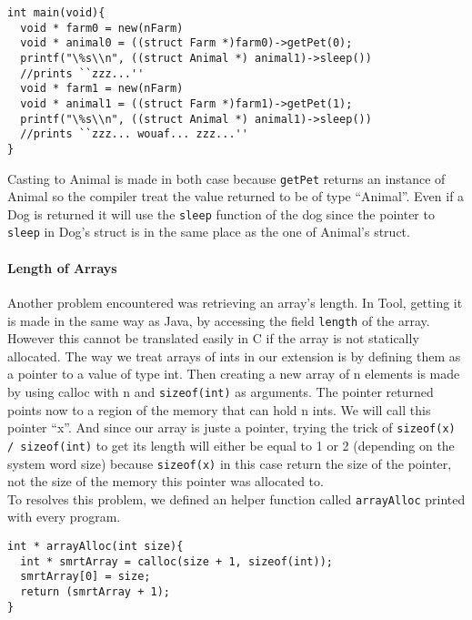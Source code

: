 \lstset{style=customc}
\begin{lstlisting}
int main(void){
  void * farm0 = new(nFarm)
  void * animal0 = ((struct Farm *)farm0)->getPet(0);
  printf("\%s\\n", ((struct Animal *) animal1)->sleep())
  //prints ``zzz...''  
  void * farm1 = new(nFarm)
  void * animal1 = ((struct Farm *)farm1)->getPet(1);
  printf("\%s\\n", ((struct Animal *) animal1)->sleep())
  //prints ``zzz... wouaf... zzz...''
}
\end{lstlisting}

Casting to Animal is made in both case because {\lstinline[basicstyle=\small\ttfamily]|getPet|} returns an instance of Animal so the compiler treat the value returned to be of type ``Animal''. Even if a Dog is returned it will use the {\lstinline[basicstyle=\small\ttfamily]|sleep|} function of the dog since the pointer to {\lstinline[basicstyle=\small\ttfamily]|sleep|} in Dog's struct is in the same place as the one of Animal's struct.

\paragraph{Length of Arrays}
Another problem encountered was retrieving an array's length. In Tool, getting it is made in the same way as Java, by accessing the field {\lstinline[basicstyle=\small\ttfamily]|length|} of the array. However this cannot be translated easily in C if the array is not statically allocated. The way we treat arrays of ints in our extension is by defining them as a pointer to a value of type int. Then creating a new array of n elements is made by using calloc with n and {\lstinline[basicstyle=\small\ttfamily]|sizeof(int)|} as arguments. The pointer returned points now to a region of the memory that can hold n ints. We will call this pointer ``x''. And since our array is juste a pointer, trying the trick of {\lstinline[basicstyle=\small\ttfamily]|sizeof(x) / sizeof(int)|} to get its length will either be equal to 1 or 2 (depending on the system word size) because {\lstinline[basicstyle=\small\ttfamily]|sizeof(x)|} in this case return the size of the pointer, not the size of the memory this pointer was allocated to.\\
To resolves this problem, we defined an helper function called {\lstinline[basicstyle=\small\ttfamily]|arrayAlloc|} printed with every program.

\begin{lstlisting}
int * arrayAlloc(int size){
  int * smrtArray = calloc(size + 1, sizeof(int));
  smrtArray[0] = size;
  return (smrtArray + 1);
}
\end{lstlisting}

